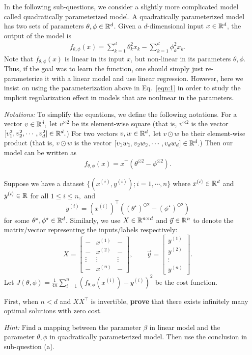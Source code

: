 \item {}
In the following sub-questions, we consider a slightly more complicated model called quadratically parameterized model. A quadratically parameterized model has two sets of parameters $\theta,\phi\in \mathbb{R}^{d}$. Given a $d$-dimensional input $x\in \mathbb{R}^{d}$, the output of the model is 
\begin{align}
	f_{\theta,\phi}(x)=\sum_{k=1}^{d}\theta_k^2 x_k - \sum_{k=1}^{d}\phi_k^2 x_k.\label{eqn:1}
\end{align}
Note that $f_{\theta,\phi}(x)$ is linear in its input $x$, but non-linear in its parameters $\theta,\phi.$ Thus, if the goal was to learn the function, one should simply just re-parameterize it with a linear model and use linear regression. However, here we insist on using the parameterization above in Eq.~\eqref{eqn:1} in order to study the implicit regularization effect in models that are nonlinear in the parameters.

\emph{Notations:} To simplify the equations, we define the following notations. For a vector $v\in \mathbb{R}^{d},$ let $v^{\odot 2}$ be its element-wise square (that is, $v^{\odot 2}$ is the vector $[v_1^2, v_2^2,\cdots, v_d^2]\in \mathbb{R}^{d}.$)  For two vectors $v,w\in \mathbb{R}^{d},$ let $v\odot w$ be their element-wise product (that is, $v\odot w$ is the vector $[v_1w_1,v_2w_2,\cdots,v_dw_d]\in \mathbb{R}^{d}.$) Then our model can be written as 
\begin{align}
	f_{\theta,\phi}(x)=x^\top (\theta^{\odot 2} -\phi^{\odot 2}).
\end{align}

Suppose we have a dataset $\{(x^{(i)}, y^{(i)});i=1,\cdots,n\}$ where $x^{(i)}\in \mathbb{R}^{d}$ and $y^{(i)}\in \mathbb{R}$ for all $1\le i\le n,$ and $$y^{(i)}=(x^{(i)})^\top ((\theta^\star)^{\odot 2}- (\phi^\star)^{\odot 2})$$ for some $\theta^\star, \phi^\star\in \mathbb{R}^{d}$.
Similarly, we use $X\in \mathbb{R}^{n\times d}$ and $\vec{y}\in \mathbb{R}^{n}$ to denote the matrix/vector representing the inputs/labels respectively:
$$
X=
\begin{bmatrix}
	- & x^{(1)} & - \\
	- & x^{(2)} & - \\
	\vdots & \vdots & \vdots\\
	- & x^{(n)} & - 
\end{bmatrix},\qquad
\vec{y}=
\begin{bmatrix}
	y^{(1)} \\
	y^{(2)}\\
	\vdots\\
	y^{(n)}
\end{bmatrix}.
$$
Let $J(\theta,\phi)=\frac{1}{4n}\sum_{i=1}^{n}(f_{\theta,\phi}(x^{(i)})-y^{(i)})^2$ be the cost function.

First, when $n<d$ and $XX^\top$ is invertible, \textbf{prove} that there exists infinitely many optimal solutions with zero cost.

\emph{Hint:} Find a mapping between the parameter $\beta$ in linear model and the parameter $\theta,\phi$ in quadratically parameterized model. Then use the conclusion in sub-question (a).